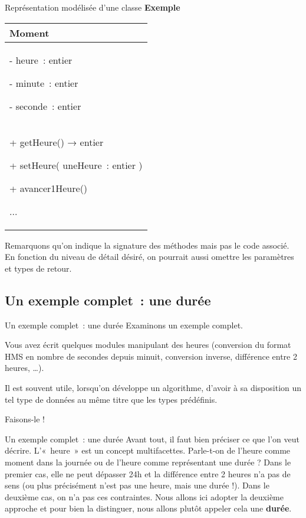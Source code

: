 \begin{frame}{Représentation modélisée d'une classe}
		\textbf{Exemple}
	
	\begin{center}
	\begin{tabular}{|m{7cm}|}
	\hline
	\centering\arraybslash \bfseries Moment\\\hline
	{ {}- heure~: entier}
	
	{ {}- minute~: entier}
	
	 {}- seconde~: entier\\\hline
	{ + getHeure() \textsf{→} entier}
	
	{ + setHeure( uneHeure~: entier )}
	
	{ + avancer1Heure()}
	
	 ...\\\hline
	\end{tabular}
	\end{center}

	\bigskip

	Remarquons qu'on indique la signature des méthodes mais
	pas le code associé. En fonction du niveau de détail désiré, on
	pourrait aussi omettre les paramètres et types de retour.
\end{frame}

\subsection{Un exemple complet~: une durée}

\begin{frame}{Un exemple complet~: une durée}
	Examinons un exemple complet. 
	
	Vous avez écrit quelques modules manipulant des heures (conversion du format
	HMS en nombre de secondes depuis minuit, conversion inverse, différence
	entre 2 heures, …). 
	
	Il est souvent utile, lorsqu’on développe un
	algorithme, d’avoir à sa disposition un tel type de données au même
	titre que les types prédéfinis. 
	
	Faisons-le !
\end{frame}

\begin{frame}{Un exemple complet~: une durée}
	Avant tout, il faut bien préciser ce que l’on veut décrire. L’«~heure~»
	est un concept multifacettes. Parle-t-on de l’heure comme moment dans
	la journée ou de l’heure comme représentant une durée ? Dans le premier
	cas, elle ne peut dépasser 24h et la différence entre 2 heures n’a pas
	de sens (ou plus précisément n’est pas une heure, mais une durée !).
	Dans le deuxième cas, on n’a pas ces contraintes. Nous allons ici
	adopter la deuxième approche et pour bien la distinguer, nous allons
	plutôt appeler cela une \textbf{durée}.
\end{frame}

